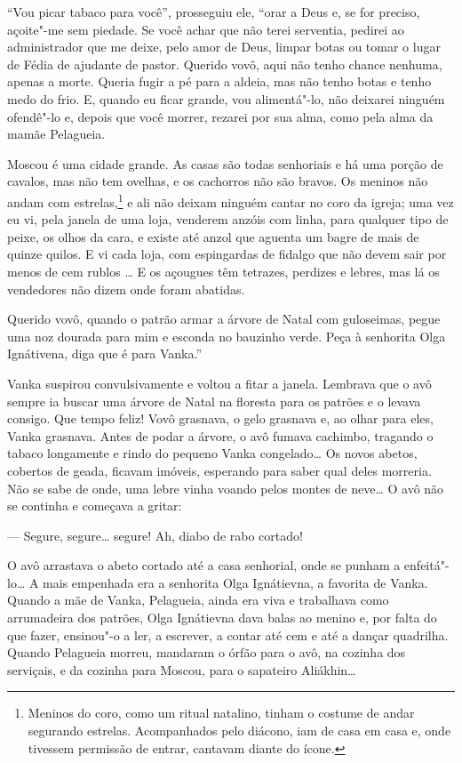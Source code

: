 ``Vou picar tabaco para você'', prosseguiu ele, ``orar a Deus e, se for
preciso, açoite"-me sem piedade. Se você achar que não terei serventia,
pedirei ao administrador que me deixe, pelo amor de Deus, limpar botas
ou tomar o lugar de Fédia de ajudante de pastor. Querido vovô, aqui não
tenho chance nenhuma, apenas a morte. Queria fugir a pé para a aldeia,
mas não tenho botas e tenho medo do frio. E, quando eu ficar grande, vou
alimentá"-lo, não deixarei ninguém ofendê"-lo e, depois que você morrer,
rezarei por sua alma, como pela alma da mamãe Pelagueia.

Moscou é uma cidade grande. As casas são todas senhoriais e há uma
porção de cavalos, mas não tem ovelhas, e os cachorros não são bravos.
Os meninos não andam com estrelas,\footnote{Meninos do coro, como um
  ritual natalino, tinham o costume de andar segurando estrelas.
  Acompanhados pelo diácono, iam de casa em casa e, onde tivessem
  permissão de entrar, cantavam diante do ícone.} e ali não deixam
ninguém cantar no coro da igreja; uma vez eu vi, pela janela de uma
loja, venderem anzóis com linha, para qualquer tipo de peixe, os olhos
da cara, e existe até anzol que aguenta um bagre de mais de quinze
quilos. E vi cada loja, com espingardas de fidalgo que não devem
sair por menos de cem rublos \ldots{} E os açougues têm tetrazes, perdizes e
lebres, mas lá os vendedores não dizem onde foram abatidas.

Querido vovô, quando o patrão armar a árvore de Natal com guloseimas,
pegue uma noz dourada para mim e esconda no bauzinho verde. Peça à
senhorita Olga Ignátivena, diga que é para Vanka.''

Vanka suspirou convulsivamente e voltou a fitar a janela. Lembrava que o
avô sempre ia buscar uma árvore de Natal na floresta para os patrões e o
levava consigo. Que tempo feliz! Vovô grasnava, o gelo grasnava e, ao
olhar para eles, Vanka grasnava. Antes de podar a árvore, o avô fumava
cachimbo, tragando o tabaco longamente e rindo do pequeno Vanka
congelado\ldots{} Os novos abetos, cobertos de geada, ficavam imóveis,
esperando para saber qual deles morreria. Não se sabe de onde, uma lebre
vinha voando pelos montes de neve\ldots{} O avô não se continha e começava a
gritar:

--- Segure, segure\ldots{} segure! Ah, diabo de rabo cortado!

O avô arrastava o abeto cortado até a casa senhorial, onde se punham a
enfeitá"-lo\ldots{} A mais empenhada era a senhorita Olga Ignátievna, a
favorita de Vanka. Quando a mãe de Vanka, Pelagueia, ainda era viva e
trabalhava como arrumadeira dos patrões, Olga Ignátievna dava balas ao
menino e, por falta do que fazer, ensinou"-o a ler, a escrever, a contar
até cem e até a dançar quadrilha. Quando Pelagueia morreu, mandaram o
órfão para o avô, na cozinha dos serviçais, e da cozinha para Moscou,
para o sapateiro Aliákhin\ldots{}

